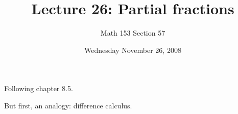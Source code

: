 \documentclass[12pt]{article}
\title{Lecture 26: Partial fractions}
\author{Math 153 Section 57}
\date{Wednesday November 26, 2008}
\begin{document}
\maketitle

Following chapter 8.5.

But first, an analogy: difference calculus.
\end{document}
